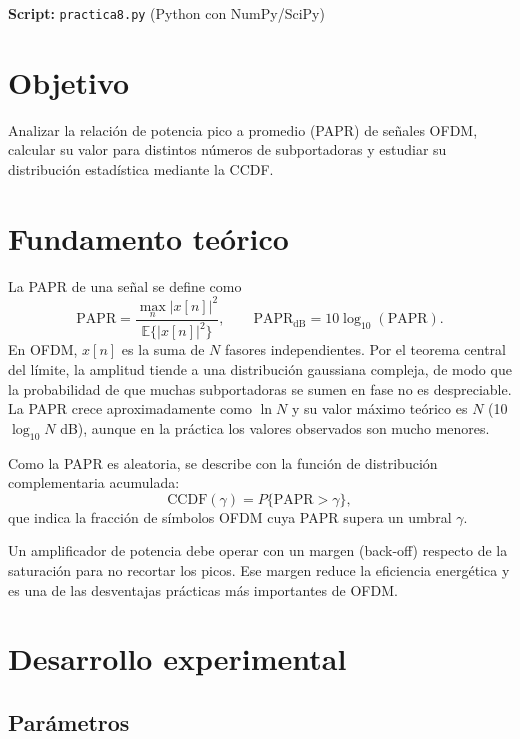 \documentclass[11pt,a4paper]{article}
\begin{document}

\textbf{Script:} \texttt{practica8.py} (Python con NumPy/SciPy)

\section{Objetivo}

Analizar la relación de potencia pico a promedio (PAPR) de señales OFDM, calcular su valor
para distintos números de subportadoras y estudiar su distribución estadística mediante la
CCDF.

\section{Fundamento teórico}

La PAPR de una señal se define como
\begin{equation}
  \mathrm{PAPR} = \frac{\max_n |x[n]|^2}{\mathbb{E}\{|x[n]|^2\}},
  \qquad
  \mathrm{PAPR}_{\mathrm{dB}} = 10\log_{10}(\mathrm{PAPR}).
\end{equation}
En OFDM, $x[n]$ es la suma de $N$ fasores independientes. Por el teorema central del
límite, la amplitud tiende a una distribución gaussiana compleja, de modo que la
probabilidad de que muchas subportadoras se sumen en fase no es despreciable. La PAPR
crece aproximadamente como $\ln N$ y su valor máximo teórico es $N$ (10$\log_{10}N$ dB),
aunque en la práctica los valores observados son mucho menores.

Como la PAPR es aleatoria, se describe con la función de distribución complementaria
acumulada:
\begin{equation}
  \mathrm{CCDF}(\gamma) = P\{\mathrm{PAPR} > \gamma\},
\end{equation}
que indica la fracción de símbolos OFDM cuya PAPR supera un umbral $\gamma$.

Un amplificador de potencia debe operar con un margen (back-off) respecto de la
saturación para no recortar los picos. Ese margen reduce la eficiencia energética y es una
de las desventajas prácticas más importantes de OFDM.

\section{Desarrollo experimental}

\subsection{Parámetros}
\end{document}
